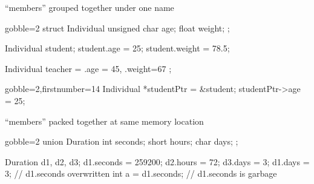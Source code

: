 \begin{frame}[fragile]
  \begin{mdframed}[style=simplebox]
    \center ``members'' grouped together under one name
  \end{mdframed}
  \begin{multicols}{2}
    \begin{cppcode*}{gobble=2}
      struct Individual {
        unsigned char age;
        float weight;
      };

      Individual student;
      student.age = 25;
      student.weight = 78.5;

      Individual teacher = {
        .age = 45,
        .weight=67
      };
    \end{cppcode*}
    \columnbreak
    \begin{cppcode*}{gobble=2,firstnumber=14}
      Individual *studentPtr =
        &student;
      studentPtr->age = 25;
    \end{cppcode*}
    \pause
    \vfill
    \hspace{-1.5cm}
    \vfill \null
  \end{multicols}
\end{frame}

\begin{frame}[fragile]
  \begin{mdframed}[style=simplebox]
    \center ``members'' packed together at same memory location
  \end{mdframed}
  \begin{multicols}{2}
    \begin{cppcode*}{gobble=2}
      union Duration {
        int seconds;
        short hours;
        char days;
      };

      Duration d1, d2, d3;
      d1.seconds = 259200;
      d2.hours = 72;
      d3.days = 3;
      d1.days = 3; // d1.seconds overwritten
      int a = d1.seconds; // d1.seconds is garbage
    \end{cppcode*}
    \pause
    \columnbreak
    \null \vfill
    \vfill \null
  \end{multicols}
\end{frame}

